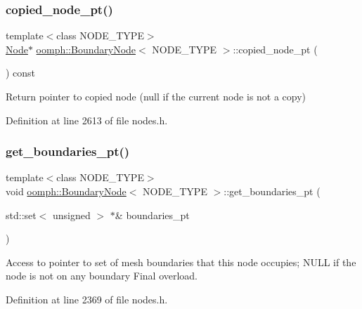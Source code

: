 \subsubsection{\texorpdfstring{copied\+\_\+node\+\_\+pt()}{copied\_node\_pt()}}
{\footnotesize\ttfamily template$<$class N\+O\+D\+E\+\_\+\+T\+Y\+PE$>$ \\
\hyperlink{classoomph_1_1Node}{Node}$\ast$ \hyperlink{classoomph_1_1BoundaryNode}{oomph\+::\+Boundary\+Node}$<$ N\+O\+D\+E\+\_\+\+T\+Y\+PE $>$\+::copied\+\_\+node\+\_\+pt (\begin{DoxyParamCaption}{ }\end{DoxyParamCaption}) const\hspace{0.3cm}{\ttfamily [inline]}}



Return pointer to copied node (null if the current node is not a copy) 



Definition at line 2613 of file nodes.\+h.

\mbox{\label{classoomph_1_1BoundaryNode_af0ed7828ec05bded2cd8d1c5576fbe5d}} 
\subsubsection{\texorpdfstring{get\+\_\+boundaries\+\_\+pt()}{get\_boundaries\_pt()}}
{\footnotesize\ttfamily template$<$class N\+O\+D\+E\+\_\+\+T\+Y\+PE$>$ \\
void \hyperlink{classoomph_1_1BoundaryNode}{oomph\+::\+Boundary\+Node}$<$ N\+O\+D\+E\+\_\+\+T\+Y\+PE $>$\+::get\+\_\+boundaries\+\_\+pt (\begin{DoxyParamCaption}\item[{std\+::set$<$ unsigned $>$ $\ast$\&}]{boundaries\+\_\+pt }\end{DoxyParamCaption})\hspace{0.3cm}{\ttfamily [inline]}}



Access to pointer to set of mesh boundaries that this node occupies; N\+U\+LL if the node is not on any boundary Final overload. 



Definition at line 2369 of file nodes.\+h.



